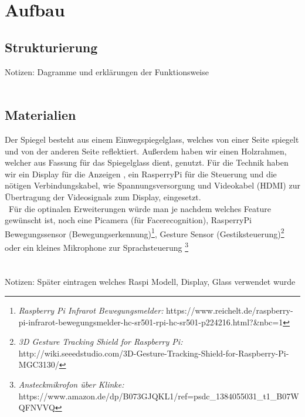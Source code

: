 \section{Aufbau}
\subsection{Strukturierung}
Notizen: Dagramme und erklärungen der Funktionsweise\\\
\subsection{Materialien}
Der Spiegel besteht aus einem Einwegspiegelglass, welches von einer Seite spiegelt und von der anderen Seite reflektiert. Außerdem haben wir einen Holzrahmen, welcher aus Fassung für das Spiegelglass dient, genutzt. Für die Technik haben wir ein Display für die Anzeigen , ein RasperryPi für die Steuerung und die nötigen Verbindungskabel, wie Spannungsversorgung und Videokabel (HDMI) zur Übertragung der Videosignals zum Display, eingesetzt.\\\
Für die optinalen Erweiterungen würde man je nachdem welches Feature gewünscht ist, noch eine Picamera (für Facerecognition), RasperryPi Bewegungssensor (Bewegungserkennung)\footnote{\textit{ Raspberry Pi Infrarot Bewegungsmelder:} https://www.reichelt.de/raspberry-pi-infrarot-bewegungsmelder-hc-sr501-rpi-hc-sr501-p224216.html?\&nbc=1}, Gesture Sensor (Gestiksteuerung)\footnote{\textit{3D Gesture Tracking Shield for Raspberry Pi:}  http://wiki.seeedstudio.com/3D-Gesture-Tracking-Shield-for-Raspberry-Pi-MGC3130/} oder ein kleines Mikrophone zur Sprachsteuerung \footnote{\textit{Ansteckmikrofon über Klinke:} https://www.amazon.de/dp/B073GJQKL1/ref=psdc\_1384055031\_t1\_B07WQFNVVQ}
\\\\\\
Notizen: Später eintragen welches Raspi Modell, Display, Glass verwendet wurde